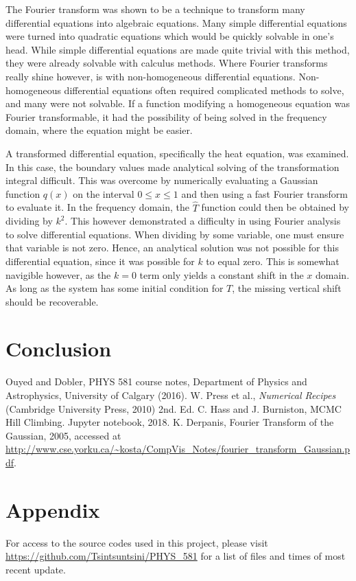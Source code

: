 \documentclass[twocolumn]{article}
\begin{document}
The Fourier transform was shown to be a technique to transform many differential equations into algebraic equations. Many simple differential equations were turned into quadratic equations which would be quickly solvable in one's head. While simple differential equations are made quite trivial with this method, they were already solvable with calculus methods. Where Fourier transforms really shine however, is with non-homogeneous differential equations. Non-homogeneous differential equations often required complicated methods to solve, and many were not solvable. If a function modifying a homogeneous equation was Fourier transformable, it had the possibility of being solved in the frequency domain, where the equation might be easier.

A transformed differential equation, specifically the heat equation, was examined. In this case, the boundary values made analytical solving of the transformation integral difficult. This was overcome by numerically evaluating a Gaussian function $q(x)$ on the interval $0 \leq x \leq 1$ and then using a fast Fourier transform to evaluate it. In the frequency domain, the $\hat{T}$ function could then be obtained by dividing by $k^2$. This however demonstrated a difficulty in using Fourier analysis to solve differential equations. When dividing by some variable, one must ensure that variable is not zero. Hence, an analytical solution was not possible for this differential equation, since it was possible for $k$ to equal zero. This is somewhat navigible however, as the $k=0$ term only yields a constant shift in the $x$ domain. As long as the system has some initial condition for $T$, the missing vertical shift should be recoverable.

\section{Conclusion}



\begin{thebibliography}{00}
	Ouyed and Dobler, PHYS 581 course notes, Department of Physics and Astrophysics, University of Calgary (2016).
	W. Press et al., \emph{Numerical Recipes} (Cambridge University Press, 2010) 2nd. Ed.
	C. Hass and J. Burniston, MCMC Hill Climbing. Jupyter notebook, 2018.
	K. Derpanis, Fourier Transform of the Gaussian, 2005, accessed at \url{http://www.cse.yorku.ca/~kosta/CompVis_Notes/fourier_transform_Gaussian.pdf}.
\end{thebibliography}

\section{Appendix}
For access to the source codes used in this project, please visit \url{https://github.com/Tsintsuntsini/PHYS_581} for a list of files and times of most recent update.
	
\end{document}
